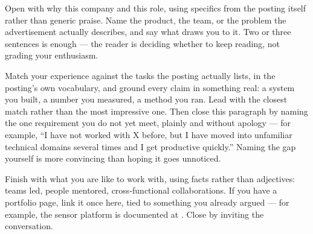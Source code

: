 \documentclass[12pt,a4paper]{article}
\begin{document}
\pagestyle{empty}
\makecvheader





\begin{clbody}
Open with why this company and this role, using specifics from the posting itself rather than
generic praise. Name the product, the team, or the problem the advertisement actually describes,
and say what draws you to it. Two or three sentences is enough --- the reader is deciding whether
to keep reading, not grading your enthusiasm.

Match your experience against the tasks the posting actually lists, in the posting's own
vocabulary, and ground every claim in something real: a system you built, a number you measured,
a method you ran. Lead with the closest match rather than the most impressive one. Then close
this paragraph by naming the one requirement you do not yet meet, plainly and without apology
--- for example, \enquote{I have not worked with X before, but I have moved into unfamiliar
technical domains several times and I get productive quickly.} Naming the gap yourself is more
convincing than hoping it goes unnoticed.

Finish with what you are like to work with, using facts rather than adjectives: teams led,
people mentored, cross-functional collaborations. If you have a portfolio page, link it once
here, tied to something you already argued --- for example, the sensor platform is documented
at . Close by inviting
the conversation.
\end{clbody}

\end{document}
